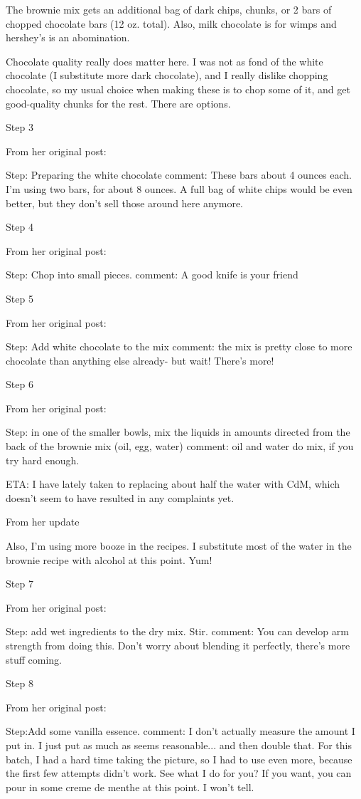 The brownie mix gets an additional bag of dark chips, chunks, or 2 bars of chopped chocolate bars (12 oz. total). Also, milk chocolate is for wimps and hershey's is an abomination.

Chocolate quality really does matter here. I was not as fond of the white chocolate (I substitute more dark chocolate), and I really dislike chopping chocolate, so my usual choice when making these is to chop some of it, and get good-quality chunks for the rest. There are options.

Step 3

From her original post:

Step: Preparing the white chocolate
comment: These bars about 4 ounces each. I'm using two bars, for about 8 ounces. A full bag of white chips would be even better, but they don't sell those around here anymore.

Step 4

From her original post:

Step: Chop into small pieces.
comment: A good knife is your friend

Step 5

From her original post:

Step: Add white chocolate to the mix
comment: the mix is pretty close to more chocolate than anything else already- but wait! There's more!

Step 6

From her original post:

Step: in one of the smaller bowls, mix the liquids in amounts directed from the back of the brownie mix (oil, egg, water)
comment: oil and water do mix, if you try hard enough.

ETA: I have lately taken to replacing about half the water with CdM, which doesn't seem to have resulted in any complaints yet.

From her update

Also, I'm using more booze in the recipes. I substitute most of the water in the brownie recipe with alcohol at this point. Yum!

Step 7

From her original post:

Step: add wet ingredients to the dry mix. Stir.
comment: You can develop arm strength from doing this. Don't worry about blending it perfectly, there's more stuff coming.

Step 8

From her original post:

Step:Add some vanilla essence.
comment: I don't actually measure the amount I put in. I just put as much as seems reasonable... and then double that. For this batch, I had a hard time taking the picture, so I had to use even more, because the first few attempts didn't work. See what I do for you?
If you want, you can pour in some creme de menthe at this point. I won't tell.

